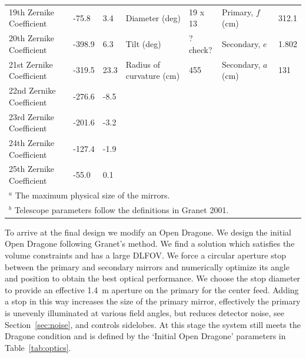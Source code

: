 \documentclass[]{spie}  %
\begin{document}
\begin{table}[ht]
\begin{adjustbox}{width=1.1\textwidth}
\begin{tabular}{|l|llll||ll|}
19th Zernike Coefficient  & -75.8             & 3.4               & Diameter (deg)          & 19 x 13  & Primary, $f$ (cm)             & 312.1 \\
20th Zernike Coefficient  & -398.9            & 6.3               & Tilt (deg)            & ?check?  & Secondary, $e$                & 1.802 \\
21st Zernike Coefficient  & -319.5            & 23.3              & Radius of curvature (cm) & 455     & Secondary, $a$ (cm)          & 131   \\
22nd Zernike Coefficient  & -276.6            & -8.5              &                           &         &                                &       \\
23rd Zernike Coefficient  & -201.6            & -3.2              &                           &         &                                &       \\
24th Zernike Coefficient  & -127.4            & -1.9              &                           &         &                                &       \\
25th Zernike Coefficient  & -55.0             & 0.1               &                           &         &                                &       \\\hline
\multicolumn{7}{l}{\footnotesize  $^a$ The maximum physical size of the mirrors.}\\
\multicolumn{7}{l}{\footnotesize  $^b$ Telescope parameters follow the definitions in Granet 2001.\cite{granet2001}} \\
\end{tabular}
\end{adjustbox}
\end{table}

To arrive at the final design we modify an Open Dragone.  We design the initial Open Dragone following Granet's method\cite{granet2001}. 
We find a solution which satisfies the volume constraints and has a large DLFOV.  We force a circular aperture stop 
between the primary and secondary mirrors and numerically optimize its angle and position to obtain the best 
optical performance.  We choose the stop diameter to provide an effective 1.4~m aperture on the primary for the center feed.  
Adding a stop in this way increases the size of the primary mirror, effectively the primary is unevenly illuminated at various 
field angles, but reduces detector noise, see Section~\ref{sec:noise}, and controls sidelobes.  At this stage the system still meets 
the Dragone condition and is defined by the `Initial Open Dragone' parameters in Table~\ref{tab:optics}.
\end{document}
